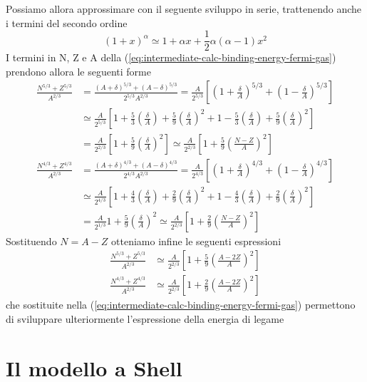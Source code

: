 Possiamo allora approssimare con il seguente sviluppo in serie, trattenendo anche i termini del secondo ordine
\[
(1 + x)^{\alpha} \simeq 1 + \alpha x + \frac{1}{2} \alpha (\alpha - 1)x^{2}
\]
I termini in N, Z e A della (\ref{eq:intermediate-calc-binding-energy-fermi-gas}) prendono allora le seguenti forme
\begin{align*}
	\frac{N^{5/3}+Z^{5/3}}{ A^{2/3}} & = \frac{(A+\delta)^{5/3} + (A-\delta)^{5/3}}{2^{5/3} A^{2/3}} = \frac{A}{2^{5/3}} \left[ \left( 1+\frac{\delta}{A} \right)^{5/3} +\left( 1 - \frac{\delta}{A} \right)^{5/3} \right] \\
	& \simeq \frac{A}{2^{5/3}} \left[ 1 + \frac{5}{3}\left( \frac{\delta}{A} \right) + \frac{5}{9} \left( \frac{\delta}{A} \right)^{2} + 1 - \frac{5}{3} \left( \frac{\delta}{A} \right) + \frac{5}{9} \left( \frac{\delta}{A} \right)^{2} \right] \\
	& = \frac{A}{2^{2/3}}  \left[ 1+\frac{5}{9} \left( \frac{\delta}{A} \right)^{2} \right]
	\simeq \frac{A}{2^{2/3}} \left[ 1 + \frac{5}{9} \left( \frac{N-Z}{A} \right)^{2} \right]
\end{align*}
\begin{align*}
	\frac{N^{4/3}+Z^{4/3}}{ A^{2/3}} & = \frac{(A+\delta)^{4/3} + (A-\delta)^{4/3}}{2^{4/3} A^{2/3}} = \frac{A}{2^{4/3}} \left[ \left( 1+\frac{\delta}{A} \right)^{4/3} +\left( 1 - \frac{\delta}{A} \right)^{4/3} \right] \\
	& \simeq \frac{A}{2^{4/3}} \left[ 1 + \frac{4}{3}\left( \frac{\delta}{A} \right) + \frac{2}{9} \left( \frac{\delta}{A} \right)^{2} + 1 - \frac{4}{3} \left( \frac{\delta}{A} \right) + \frac{2}{9} \left( \frac{\delta}{A} \right)^{2} \right] \\
	& = \frac{A}{2^{1/3}}  1+\frac{5}{9} \left( \frac{\delta}{A} \right)^{2}
	\simeq \frac{A}{2^{2/3}} \left[ 1 + \frac{2}{9} \left( \frac{N-Z}{A} \right)^{2} \right]
\end{align*}
Sostituendo $N=A-Z$ otteniamo infine le seguenti espressioni
\begin{align*}
	\frac{N^{5/3}+Z^{5/3}}{ A^{2/3}} &\simeq \frac{A}{2^{2/3}} \left[ 1 + \frac{5}{9} \left( \frac{A-2Z}{A} \right)^{2} \right]\\
	\frac{N^{4/3}+Z^{4/3}}{ A^{2/3}} &\simeq \frac{A}{2^{2/3}} \left[ 1 + \frac{2}{9} \left( \frac{A-2Z}{A} \right)^{2} \right]
\end{align*}
che sostituite nella (\ref{eq:intermediate-calc-binding-energy-fermi-gas}) permettono di sviluppare ulteriormente
l’espressione della energia di legame

\section{Il modello a Shell}\label{sec:il-modello-a-shell}


